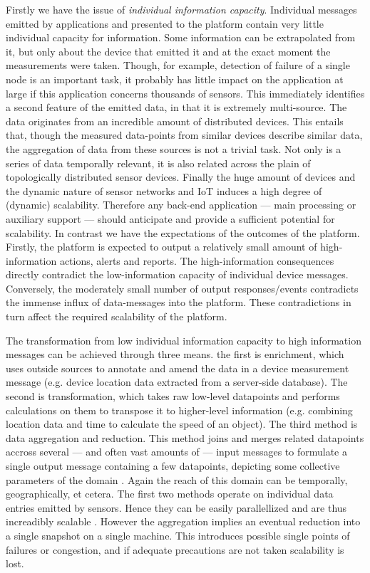 Firstly we have the issue of \emph{individual information capacity}. Individual messages emitted by applications and presented to the platform contain very little individual capacity for information. Some information can be extrapolated from it, but only about the device that emitted it and at the exact moment the measurements were taken. Though, for example, detection of failure of a single node is an important task, it probably has little impact on the application at large if this application concerns thousands of sensors. This immediately identifies a second feature of the emitted data, in that it is extremely multi-source. The data originates from an incredible amount of distributed devices. This entails that, though the measured data-points from similar devices describe similar data, the aggregation of data from these sources is not a trivial task. Not only is a series of data temporally relevant, it is also related across the plain of topologically distributed sensor devices. Finally the huge amount of devices and the dynamic nature of sensor networks and IoT induces a high degree of (dynamic) scalability. Therefore any back-end application --- main processing or auxiliary support --- should anticipate and provide a sufficient potential for scalability. In contrast we have the expectations of the outcomes of the platform. Firstly, the platform is expected to output a relatively small amount of high-information actions, alerts and reports. The high-information consequences directly contradict the low-information capacity of individual device messages. Conversely, the moderately small number of output responses/events contradicts the immense influx of data-messages into the platform. These contradictions in turn affect the required scalability of the platform. 

The transformation from low individual information capacity to high information messages can be achieved through three means. the first is enrichment, which uses outside sources to annotate and amend the data in a device measurement message (e.g. device location data extracted from a server-side database)\cite{data_enrichment}. The second is transformation, which takes raw low-level datapoints and performs calculations on them to transpose it to higher-level information (e.g. combining location data and time to calculate the speed of an object)\cite{information_transformation}. The third method is data aggregation and reduction. This method joins and merges related datapoints accross several --- and often vast amounts of --- input messages to formulate a single output message containing a few datapoints, depicting some collective parameters of the domain \cite{information_transformation}. Again the reach of this domain can be temporally, geographically, et cetera. The first two methods operate on individual data entries emitted by sensors. Hence they can be easily parallellized and are thus increadibly scalable \cite{boek:Exploratory Data Mining and Data Cleaning:C3}. However the aggregation implies an eventual reduction into a single snapshot on a single machine. This introduces possible single points of failures or congestion, and if adequate precautions are not taken scalability is lost.

